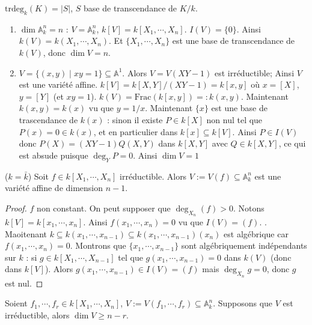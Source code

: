             \begin{defi}
                $\mathrm{trdeg}_k(K) = |S|$, $S$ base de transcendance de $K/k$.
            \end{defi}
            \begin{expl}
                \begin{enumerate}
                    \item $\dim \mathbb{A}_k^n = n$ : $V = \mathbb{A}_k^n$, $k[V] = k[X_1, \cdots, X_n]$. $I(V) = \{0\}$. Ainsi $k(V) = k(X_1, \cdots, X_n)$. Et $\{X_1, \cdots, X_n\}$ est une base de transcendance de $k(V)$, donc $\dim V = n$.
                    \item $V = \{(x,y) \mid xy = 1\} \subseteq \mathbb{A}^1$. Alors $V = V(XY - 1)$ est irréductible; Ainsi $V$ est une variété affine. $k[V] = k[X,Y]/(XY - 1) = k[x,y]$ où $x = [X]$, $y = [Y]$ (et $xy = 1$). $k(V) = \mathrm{Frac} (k[x,y]) =: k(x,y)$. Maintenant $k(x,y) = k(x)$ vu que $y = 1/x$. Maintenant $\{x\}$ est une base de trascendance de $k(x)$ : sinon il existe $P \in k[X]$ non nul tel que $P(x) = 0 \in k(x)$, et en particulier dans $k[x] \subseteq k[V]$. Ainsi $P \in I(V)$ donc $P(X) = (XY - 1)Q(X,Y)$ dans $k[X,Y]$ avec $Q \in k[X,Y]$, ce qui est absude puisque $\deg_YP = 0$. Ainsi $\dim V = 1$
                \end{enumerate} 
            \end{expl}
            \begin{lemm}
                ($k = \bar k$) Soit $f \in k[X_1, \cdots, X_n]$ irréductible. Alors $V := V(f) \subseteq \mathbb{A}_k^n$ est une variété affine de dimension $n-1$.
            \end{lemm}
            \begin{proof}
                $f$ non constant. On peut supposer que $\deg_{X_n}(f) > 0$. Notons $k[V] = k[x_1, \cdots, x_n]$. Ainsi $f(x_1, \cdots, x_n) = 0$ vu que $I(V) = (f)$. . Maoitenant $k \subseteq k(x_1, \cdots, x_{n-1}) \subseteq k(x_1, \cdots, x_{n-1})(x_n)$ est algébrique car $f(x_1, \cdots, x_n) = 0$. Montrons que $\{x_1, \cdots, x_{n-1}\}$ sont algébriquement indépendants sur $k$ : si $g \in k[X_1, \cdots, X_{n-1}]$ tel que $g(x_1, \cdots, x_{n-1}) = 0$ dans $k(V)$ (donc dans $k[V]$). Alors $g(x_1, \cdots, x_{n-1}) \in I(V) = (f)$ mais $\deg_{X_n} g = 0$, donc $g$ est nul.
            \end{proof}
            \begin{remq}
                \label{rq113}
                Soient $f_1, \cdots, f_r \in k[X_1, \cdots, X_n]$, $V := V(f_1, \cdots, f_r) \subseteq \mathbb{A}^n_k$. Supposons que $V$ est irréductible, alors $\dim V \geq n-r$. 
            \end{remq}
